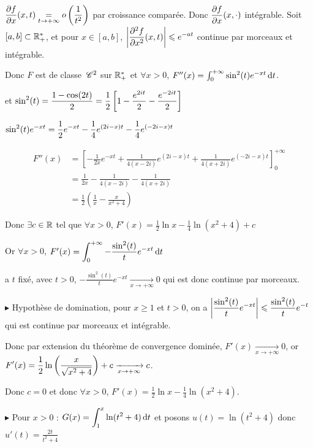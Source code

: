 \begin{exemple}
    $\displaystyle \frac{\partial f}{\partial x} (x, t) \underset{t \to + \infty}{=} o\left( \frac 1 {t^2} \right)$ par croissance comparée.
    Donc $\displaystyle \frac{\partial f}{\partial x} (x, \cdot)$ intégrable. 
    Soit $[a, b] \subset \mathbb{R}_+^*$, et pour $x \in [a, b]$, $\displaystyle \left| \frac{\partial^{2} f}{\partial x^{2}} (x, t) \right| \leqslant e^{-at}$ continue par morceaux et intégrable.

    Donc $F$ est de classe $\,\mathscr C^{2}$ sur $\mathbb{R}_+^*$ et $\forall x > 0$, $F''(x) = \int_0^{+ \infty} \sin^2(t) e^{-xt} \,\mathrm{d}t$.

    et $\displaystyle \sin^2(t) = \frac{1 - \cos (2t)}{2} = \frac 1 2 \left[ 1 - \frac{e^{2it}}{2} - \frac{e^{-2it}}{2} \right]$

    $\displaystyle \sin^2(t) e^{-xt} = \frac 1 2 e^{-xt} - \frac 1 4 e^{(2i - x)t} - \frac 1 4e^{(-2i - x)t}$

    \begin{align}
        F''(x) & = \left[ - \frac 1 {2x} e^{-xt} + \frac 1 {4(x - 2i)} e^{(2i - x)t} + \frac 1 {4(x + 2i)} e^{(-2i - x)t} \right]_0^{+ \infty} \\
        & = \frac{1}{2x} - \frac 1 {4(x - 2i)} - \frac 1 {4(x + 2i)} \\
        & = \frac{1}{2} \left( \frac{1}{x} - \frac{x}{x^2 + 4} \right) 
    \end{align}

    Donc $\exists c \in \mathbb{R}$ tel que $\forall x > 0$, $F'(x) = \frac 1 2 \ln x - \frac 1 4 \ln(x^2 + 4) + c$ 

    Or $\forall x > 0 $, $F'(x) = \displaystyle \int_{0}^{+ \infty} - \frac{\sin^2(t)}{t} e^{-xt} \,\mathrm{d}t$

    a $t$ fixé, avec $t > 0$, $- \frac{\sin^2(t)}{t} e^{-xt} \xrightarrow[x \to + \infty]{} 0$ qui est donc continue par morceaux. 

    \avspace $\blacktriangleright$ Hypothèse de domination, pour $x \geqslant 1$ et $t > 0$, 
    on a $\displaystyle \left| \frac{\sin^2(t)}{t} e^{-xt} \right| \leqslant \frac{\sin^2(t)}{t} e^{-t}$ qui est continue par morceaux et intégrable.

    Donc par extension du théorème de convergence dominée, $F'(x) \xrightarrow[x \to + \infty]{} 0$, 
    or $\displaystyle F'(x) = \frac 1 2 \ln \left( \frac x {\sqrt{x^2 + 4}} \right) + c \xrightarrow[x \to + \infty]{} c$.

    Donc $c = 0$ et donc $\forall x > 0$, $F'(x) = \frac 1 2 \ln x - \frac 1 4 \ln(x^2 + 4)$. 

    \avspace $\blacktriangleright$ Pour $x > 0$ : $G(x) = \displaystyle \int_{1}^{x} \ln(t^2 + 4) \,\mathrm{d}t $ et posons 
    $u(t) = \ln(t^2 + 4)$ donc $u'(t) = \frac{2t}{t^2 + 4} $


\end{exemple}
